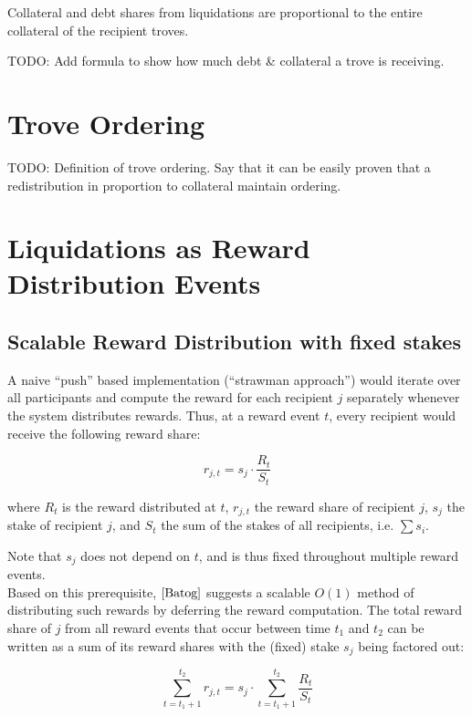 \documentclass[reqno]{article}
\begin{document}
Collateral and debt shares from liquidations are proportional to the entire collateral of the recipient troves. 

TODO: Add formula to show how much debt & collateral a trove is receiving.


\section{Trove Ordering}
TODO: Definition of trove ordering.
Say that it can be easily proven that a redistribution in proportion to collateral maintain ordering.

\section{Liquidations as Reward Distribution Events}

\subsection{Scalable Reward Distribution with fixed stakes}

A naive “push” based implementation (“strawman approach”) would iterate over all participants and compute the reward for each recipient $j$ separately whenever the system distributes rewards. Thus, at a reward event $t$, every recipient would receive the following reward share:

\begin{equation} 
    r_{j,t}=s_j \cdot \frac{R_t}{S_t}
\end{equation}

where $R_t$ is the reward distributed at $t$, $r_{j,t}$ the reward share of recipient $j$, $s_j$ the stake of recipient $j$, and $S_t$ the sum of the stakes of all recipients, i.e. $\sum s_i$.

Note that $s_j$ does not depend on $t$, and is thus fixed throughout multiple reward events.  \\

Based on this prerequisite, $\cite{Batog}$ suggests a scalable $O(1)$ method of distributing such rewards by deferring the reward computation. The total reward share of $j$ from all reward events that occur between time $t_1$ and $t_2$ can be written as a sum of its reward shares with the (fixed) stake $s_j$ being factored out:

\begin{equation}
    \sum\limits_{t=t_1+1}^{t_2} r_{j,t} = s_j \cdot \sum\limits_{t=t_1+1}^{t_2}\frac{R_t}{S_t}
\end{equation}
\end{document}
